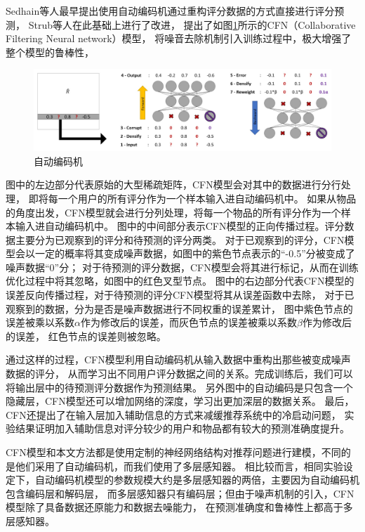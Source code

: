 Sedhain等人\parencite{sedhain2015autorec}最早提出使用自动编码机通过重构评分数据的方式直接进行评分预测，
Strub等人\parencite{strub2016hybrid}在此基础上进行了改进，
提出了如图\ref{fig:ae}所示的CFN（Collaborative Filtering Neural network）模型，
将噪音去除机制引入训练过程中，极大增强了整个模型的鲁棒性，

\begin{figure}[htbp]
\centering
\includegraphics[scale=0.22]{images/ae.jpeg}
\caption{自动编码机}
\label{fig:ae}
\end{figure}

图中的左边部分代表原始的大型稀疏矩阵，CFN模型会对其中的数据进行分行处理，
即将每一个用户的所有评分作为一个样本输入进自动编码机中。
如果从物品的角度出发，CFN模型就会进行分列处理，将每一个物品的所有评分作为一个样本输入进自动编码机中。
图中的中间部分表示CFN模型的正向传播过程。评分数据主要分为已观察到的评分和待预测的评分两类。
对于已观察到的评分，CFN模型会以一定的概率将其变成噪声数据，如图中的紫色节点表示的``-0.5''分被变成了噪声数据``0''分；
对于待预测的评分数据，CFN模型会将其进行标记，从而在训练优化过程中将其忽略，如图中的红色叉型节点。
图中的右边部分代表CFN模型的误差反向传播过程，对于待预测的评分CFN模型将其从误差函数中去除，
对于已观察到的数据，分为是否是噪声数据进行不同权重的误差累计，
图中紫色节点的误差被乘以系数$\alpha$作为修改后的误差，而灰色节点的误差被乘以系数$\beta$作为修改后的误差，
红色节点的误差则被忽略。

通过这样的过程，CFN模型利用自动编码机从输入数据中重构出那些被变成噪声数据的评分，
从而学习出不同用户评分数据之间的关系。完成训练后，我们可以将输出层中的待预测评分数据作为预测结果。
另外图中的自动编码是只包含一个隐藏层，CFN模型还可以增加网络的深度，学习出更加深层的数据关系。
最后，CFN还提出了在输入层加入辅助信息的方式来减缓推荐系统中的冷启动问题，
实验结果证明加入辅助信息对评分较少的用户和物品都有较大的预测准确度提升。

CFN模型和本文方法都是使用定制的神经网络结构对推荐问题进行建模，不同的是他们采用了自动编码机，而我们使用了多层感知器。
相比较而言，相同实验设定下，自动编码机模型的参数规模大约是多层感知器的两倍，主要因为自动编码机包含编码层和解码层，
而多层感知器只有编码层；但由于噪声机制的引入，CFN模型除了具备数据还原能力和数据去噪能力，
在预测准确度和鲁棒性上都高于多层感知器。

